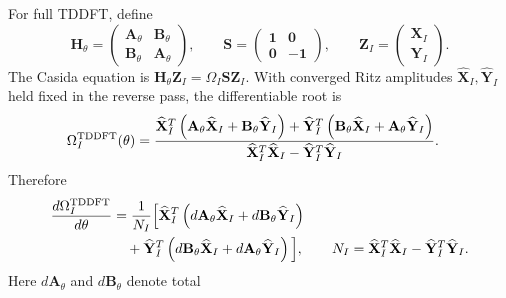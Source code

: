 For full TDDFT, define
\begin{equation}
  \mathbf{H}_{\theta}
  =
  \begin{pmatrix}
  \mathbf{A}_{\theta} & \mathbf{B}_{\theta} \\
  \mathbf{B}_{\theta} & \mathbf{A}_{\theta}
  \end{pmatrix},
  \qquad
  \mathbf{S}
  =
  \begin{pmatrix}
  \mathbf{1} & \mathbf{0} \\
  \mathbf{0} & -\mathbf{1}
  \end{pmatrix},
  \qquad
  \mathbf{Z}_I=
  \begin{pmatrix}\mathbf{X}_I\\\mathbf{Y}_I\end{pmatrix}.
  \label{eq:casida-hs-si}
\end{equation}
The Casida equation is
$\mathbf{H}_{\theta}\mathbf{Z}_I
=\Omega_I\mathbf{S}\mathbf{Z}_I$. With converged Ritz amplitudes
$\widehat{\mathbf{X}}_I,\widehat{\mathbf{Y}}_I$ held fixed in the
reverse pass, the differentiable root is
\begin{equation}
\begin{aligned}
  \Omega_I^{\rm TDDFT}(\theta)
  &=
  \frac{
  \widehat{\mathbf{X}}_I^{T}
  \left(\mathbf{A}_{\theta}\widehat{\mathbf{X}}_I
       +\mathbf{B}_{\theta}\widehat{\mathbf{Y}}_I\right)
  +
  \widehat{\mathbf{Y}}_I^{T}
  \left(\mathbf{B}_{\theta}\widehat{\mathbf{X}}_I
       +\mathbf{A}_{\theta}\widehat{\mathbf{Y}}_I\right)
  }{
  \widehat{\mathbf{X}}_I^{T}\widehat{\mathbf{X}}_I
  -
  \widehat{\mathbf{Y}}_I^{T}\widehat{\mathbf{Y}}_I
  } .
\end{aligned}
  \label{eq:casida-rayleigh-si}
\end{equation}
Therefore
\begin{equation}
\begin{aligned}
  \frac{d\Omega_I^{\rm TDDFT}}{d\theta}
  &=
  \frac{1}{N_I}
  \Big[
  \widehat{\mathbf{X}}_I^{T}
  \left(d\mathbf{A}_{\theta}\widehat{\mathbf{X}}_I
       +d\mathbf{B}_{\theta}\widehat{\mathbf{Y}}_I\right) \\
  &\quad+
  \widehat{\mathbf{Y}}_I^{T}
  \left(d\mathbf{B}_{\theta}\widehat{\mathbf{X}}_I
       +d\mathbf{A}_{\theta}\widehat{\mathbf{Y}}_I\right)
  \Big],
  \qquad
  N_I=
  \widehat{\mathbf{X}}_I^{T}\widehat{\mathbf{X}}_I
  -
  \widehat{\mathbf{Y}}_I^{T}\widehat{\mathbf{Y}}_I .
\end{aligned}
  \label{eq:casida-root-gradient-si}
\end{equation}
Here $d\mathbf{A}_{\theta}$ and $d\mathbf{B}_{\theta}$ denote total
